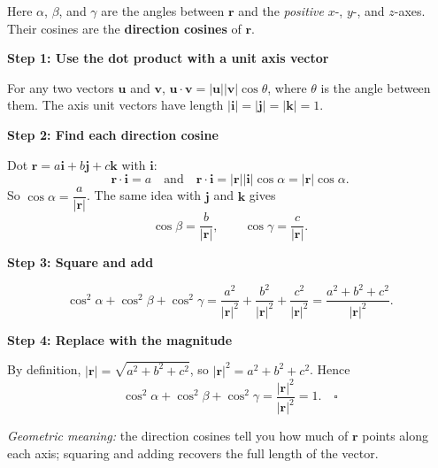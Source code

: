 \begin{solution}[Sketch]
Here $\alpha$, $\beta$, and $\gamma$ are the angles between $\mathbf{r}$ and the \emph{positive} $x$-, $y$-, and $z$-axes. Their cosines are the \textbf{direction cosines} of $\mathbf{r}$.

\vspace{0.3em}
\textbf{Step 1: Use the dot product with a unit axis vector}

For any two vectors $\mathbf{u}$ and $\mathbf{v}$, $\mathbf{u}\cdot\mathbf{v} = |\mathbf{u}||\mathbf{v}|\cos\theta$, where $\theta$ is the angle between them. The axis unit vectors have length $|\mathbf{i}| = |\mathbf{j}| = |\mathbf{k}| = 1$.

\vspace{0.3em}
\textbf{Step 2: Find each direction cosine}

Dot $\mathbf{r} = a\mathbf{i} + b\mathbf{j} + c\mathbf{k}$ with $\mathbf{i}$:
\[
\mathbf{r}\cdot\mathbf{i} = a
\quad\text{and}\quad
\mathbf{r}\cdot\mathbf{i} = |\mathbf{r}||\mathbf{i}|\cos\alpha = |\mathbf{r}|\cos\alpha.
\]
So $\cos\alpha = \dfrac{a}{|\mathbf{r}|}$. The same idea with $\mathbf{j}$ and $\mathbf{k}$ gives
\[
\cos\beta = \frac{b}{|\mathbf{r}|}, \qquad \cos\gamma = \frac{c}{|\mathbf{r}|}.
\]

\vspace{0.3em}
\textbf{Step 3: Square and add}

\[
\cos^2\alpha + \cos^2\beta + \cos^2\gamma
= \frac{a^2}{|\mathbf{r}|^2} + \frac{b^2}{|\mathbf{r}|^2} + \frac{c^2}{|\mathbf{r}|^2}
= \frac{a^2 + b^2 + c^2}{|\mathbf{r}|^2}.
\]

\vspace{0.3em}
\textbf{Step 4: Replace with the magnitude}

By definition, $|\mathbf{r}| = \sqrt{a^2 + b^2 + c^2}$, so $|\mathbf{r}|^2 = a^2 + b^2 + c^2$. Hence
\[
\cos^2\alpha + \cos^2\beta + \cos^2\gamma
= \frac{|\mathbf{r}|^2}{|\mathbf{r}|^2} = 1. \quad \square
\]

\textit{Geometric meaning:} the direction cosines tell you how much of $\mathbf{r}$ points along each axis; squaring and adding recovers the full length of the vector.
\end{solution}

\vspace{1em}

